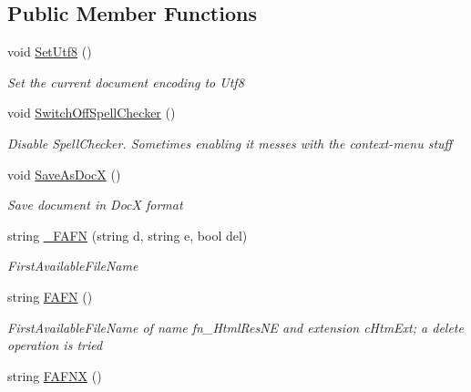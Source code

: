 \subsection*{Public Member Functions}
\begin{DoxyCompactItemize}
\item 
void \hyperlink{class_e_u_cases_1_1_e_u_links_checker_word_add_in_1_1_e_u_links_checker_add_in_a736a715c9b20f41db3e2ffe97918765f}{Set\+Utf8} ()
\begin{DoxyCompactList}\small\item\em Set the current document encoding to Utf8 \end{DoxyCompactList}\item 
void \hyperlink{class_e_u_cases_1_1_e_u_links_checker_word_add_in_1_1_e_u_links_checker_add_in_a2bd0e055d6d0c439f9091e1f47a4b2e4}{Switch\+Off\+Spell\+Checker} ()
\begin{DoxyCompactList}\small\item\em Disable Spell\+Checker. Sometimes enabling it messes with the context-\/menu stuff \end{DoxyCompactList}\item 
void \hyperlink{class_e_u_cases_1_1_e_u_links_checker_word_add_in_1_1_e_u_links_checker_add_in_aaa1ab4d4edd26d410ced9ca37ff31c0a}{Save\+As\+Doc\+X} ()
\begin{DoxyCompactList}\small\item\em Save document in Doc\+X format \end{DoxyCompactList}\item 
string \hyperlink{class_e_u_cases_1_1_e_u_links_checker_word_add_in_1_1_e_u_links_checker_add_in_a580eb7df218c8fd1bdadf144a2ce7ab8}{\+\_\+\+F\+A\+F\+N} (string d, string e, bool del)
\begin{DoxyCompactList}\small\item\em First\+Available\+File\+Name \end{DoxyCompactList}\item 
string \hyperlink{class_e_u_cases_1_1_e_u_links_checker_word_add_in_1_1_e_u_links_checker_add_in_a7f2aa12a57e811ee16bbb50001c5c18a}{F\+A\+F\+N} ()
\begin{DoxyCompactList}\small\item\em First\+Available\+File\+Name of name fn\+\_\+\+Html\+Res\+N\+E and extension c\+Htm\+Ext; a delete operation is tried \end{DoxyCompactList}\item 
string \hyperlink{class_e_u_cases_1_1_e_u_links_checker_word_add_in_1_1_e_u_links_checker_add_in_ab9873336e8fee7b886b9544ad160c60b}{F\+A\+F\+N\+X} ()

\end{DoxyCompactItemize}
